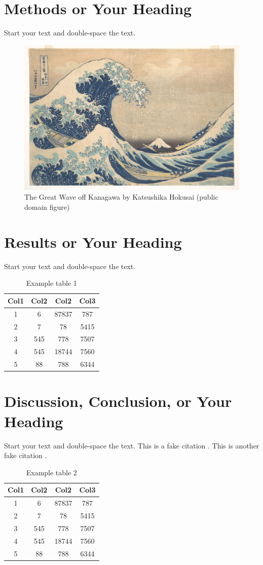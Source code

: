 \documentclass[debug, font=Times]{gw-dissertation}[2021/11/19]
\begin{document}
\chapter{Methods or Your Heading}

Start your text and double-space the text.
\begin{figure}[h!]
    \Centering
    \includegraphics[width=0.5\linewidth]{the_great_wave.jpg}
    \caption{The Great Wave off Kanagawa by Katsushika Hokusai (public domain figure)}
\end{figure}

\chapter{Results or Your Heading}

Start your text and double-space the text.
\begin{table}[h!]
    \Centering
    \begin{tabular}{||c c c c||}
         \hline
         Col1 & Col2 & Col2 & Col3 \\ [0.5ex]
         \hline\hline
         1 & 6 & 87837 & 787 \\
         2 & 7 & 78 & 5415 \\
         3 & 545 & 778 & 7507 \\
         4 & 545 & 18744 & 7560 \\
         5 & 88 & 788 & 6344 \\ [1ex]
         \hline
    \end{tabular}
    \caption{Example table 1}
\end{table}

\chapter{Discussion, Conclusion, or Your Heading}

Start your text and double-space the text. This is a fake citation \cite{author1_1990}. This is
another fake citation \cite{author2_2000}.
\begin{table}[h!]
    \Centering
    \begin{tabular}{||c c c c||}
         \hline
         Col1 & Col2 & Col2 & Col3 \\ [0.5ex]
         \hline\hline
         1 & 6 & 87837 & 787 \\
         2 & 7 & 78 & 5415 \\
         3 & 545 & 778 & 7507 \\
         4 & 545 & 18744 & 7560 \\
         5 & 88 & 788 & 6344 \\ [1ex]
         \hline
    \end{tabular}
    \caption{Example table 2}
\end{table}
\end{document}
